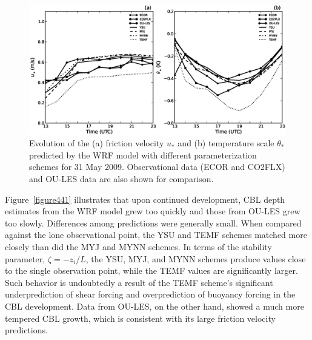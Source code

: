 \begin{figure}[ht!]
\begin{center}
\includegraphics[width=\textwidth]{figures/chapter4/ust_tst_phys_20090531}
\end{center}
\caption{Evolution of the (a) friction velocity $u_*$ and (b) temperature scale $\theta_*$ predicted by the WRF model with different parameterization schemes for 31 May 2009. Observational data (ECOR and CO2FLX) and OU-LES data are also shown for comparison.}
\label{figure440}
\end{figure}


Figure~\ref{figure441} illustrates that upon continued development, CBL depth estimates from the WRF model grew too quickly and those from OU-LES grew too slowly. Differences among predictions were generally small. When compared against the lone observational point, the YSU and TEMF schemes matched more closely than did the MYJ and MYNN schemes. In terms of the stability parameter, $\zeta = -z_i / L$, the YSU, MYJ, and MYNN schemes produce values close to the single observation point, while the TEMF values are significantly larger. Such behavior is undoubtedly a result of the TEMF scheme's significant underprediction of shear forcing and overprediction of buoyancy forcing in the CBL development. Data from OU-LES, on the other hand, showed a much more tempered CBL growth, which is consistent with its large friction velocity predictions.


